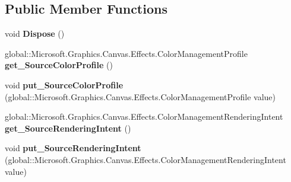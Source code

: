 \subsection*{Public Member Functions}
\begin{DoxyCompactItemize}
\item 
\mbox{\label{class_microsoft_1_1_graphics_1_1_canvas_1_1_effects_1_1_color_management_effect_a9fe37cfd32383d04402b1d66ee3eda0a}} 
void {\bfseries Dispose} ()
\item 
\mbox{\label{class_microsoft_1_1_graphics_1_1_canvas_1_1_effects_1_1_color_management_effect_a6b058fa689ed71507e964b28fe6170c5}} 
global\+::\+Microsoft.\+Graphics.\+Canvas.\+Effects.\+Color\+Management\+Profile {\bfseries get\+\_\+\+Source\+Color\+Profile} ()
\item 
\mbox{\label{class_microsoft_1_1_graphics_1_1_canvas_1_1_effects_1_1_color_management_effect_a5810de208f1afdb9ab4f2e1b99d5216f}} 
void {\bfseries put\+\_\+\+Source\+Color\+Profile} (global\+::\+Microsoft.\+Graphics.\+Canvas.\+Effects.\+Color\+Management\+Profile value)
\item 
\mbox{\label{class_microsoft_1_1_graphics_1_1_canvas_1_1_effects_1_1_color_management_effect_a3e5a8a23a3a6aa5fd2f094f13e898a44}} 
global\+::\+Microsoft.\+Graphics.\+Canvas.\+Effects.\+Color\+Management\+Rendering\+Intent {\bfseries get\+\_\+\+Source\+Rendering\+Intent} ()
\item 
\mbox{\label{class_microsoft_1_1_graphics_1_1_canvas_1_1_effects_1_1_color_management_effect_ae01d8260768b483504a24daed27da2b8}} 
void {\bfseries put\+\_\+\+Source\+Rendering\+Intent} (global\+::\+Microsoft.\+Graphics.\+Canvas.\+Effects.\+Color\+Management\+Rendering\+Intent value)
\item 
\mbox{\label{class_microsoft_1_1_graphics_1_1_canvas_1_1_effects_1_1_color_management_effect_a74ae08e1f5d954e1f9d89ddd5af9653d}} 

\end{DoxyCompactItemize}

